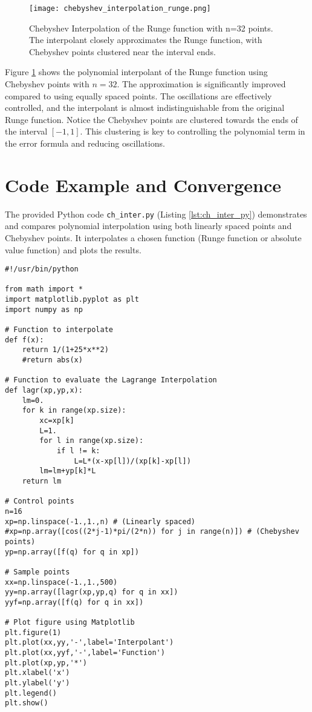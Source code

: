 \documentclass{article}
\begin{document}
\begin{figure}[H]
    \centering
    \texttt{[image: chebyshev\_interpolation\_runge.png]}
    \caption{Chebyshev Interpolation of the Runge function with n=32 points. The interpolant closely approximates the Runge function, with Chebyshev points clustered near the interval ends.}
    \label{fig:chebyshev_runge}
\end{figure}

Figure \ref{fig:chebyshev_runge} shows the polynomial interpolant of the Runge function using Chebyshev points with $n=32$.  The approximation is significantly improved compared to using equally spaced points. The oscillations are effectively controlled, and the interpolant is almost indistinguishable from the original Runge function. Notice the Chebyshev points are clustered towards the ends of the interval $[-1, 1]$. This clustering is key to controlling the polynomial term in the error formula and reducing oscillations.


\section{Code Example and Convergence}

The provided Python code \texttt{ch\_inter.py} (Listing \ref{lst:ch_inter_py}) demonstrates and compares polynomial interpolation using both linearly spaced points and Chebyshev points. It interpolates a chosen function (Runge function or absolute value function) and plots the results.

\begin{lstlisting}
#!/usr/bin/python

from math import *
import matplotlib.pyplot as plt
import numpy as np

# Function to interpolate
def f(x):
    return 1/(1+25*x**2)
    #return abs(x)

# Function to evaluate the Lagrange Interpolation
def lagr(xp,yp,x):
    lm=0.
    for k in range(xp.size):
        xc=xp[k]
        L=1.
        for l in range(xp.size):
            if l != k:
                L=L*(x-xp[l])/(xp[k]-xp[l])
        lm=lm+yp[k]*L
    return lm

# Control points
n=16
xp=np.linspace(-1.,1.,n) # (Linearly spaced)
#xp=np.array([cos((2*j-1)*pi/(2*n)) for j in range(n)]) # (Chebyshev points)
yp=np.array([f(q) for q in xp])

# Sample points
xx=np.linspace(-1.,1.,500)
yy=np.array([lagr(xp,yp,q) for q in xx])
yyf=np.array([f(q) for q in xx])

# Plot figure using Matplotlib
plt.figure(1)
plt.plot(xx,yy,'-',label='Interpolant')
plt.plot(xx,yyf,'-',label='Function')
plt.plot(xp,yp,'*')
plt.xlabel('x')
plt.ylabel('y')
plt.legend()
plt.show()
\end{lstlisting}
\end{document}
